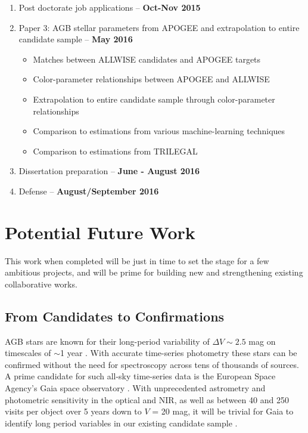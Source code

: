 \begin{enumerate}
\item Post doctorate job applications -- \textbf{Oct-Nov 2015}
\item Paper 3: AGB stellar parameters from APOGEE and extrapolation to entire candidate sample -- \textbf{May 2016}
	\begin{itemize}
		\item Matches between ALLWISE candidates and APOGEE targets
		\item Color-parameter relationships between APOGEE and ALLWISE
		\item Extrapolation to entire candidate sample through color-parameter relationships
		\item Comparison to estimations from various machine-learning techniques
		\item Comparison to estimations from TRILEGAL
	\end{itemize}
\item Dissertation preparation -- \textbf{June - August 2016}
\item Defense -- \textbf{August/September 2016}
\end{enumerate}

\section{Potential Future Work}
This work when completed will be just in time to set the stage for a few ambitious projects, and will be prime for building new and strengthening existing collaborative works.

\subsection{From Candidates to Confirmations}
AGB stars are known for their long-period variability of $\Delta V\sim2.5$ mag on timescales of $\sim$1 year \citep{2000PASA...17...18W, 2008PhDT.........6F}. With accurate time-series photometry these stars can be confirmed without the need for spectroscopy across tens of thousands of sources. A prime candidate for such all-sky time-series data is the European Space Agency's Gaia space observatory \citep{2001A&A...369..339P,2002MNRAS.331..649B}. With unprecedented astrometry and photometric sensitivity in the optical and NIR, as well as between 40 and 250 visits per object over 5 years down to $V$ = 20 mag, it will be trivial for Gaia to identify long period variables in our existing candidate sample \citep{2000ASPC..203...71E}.

